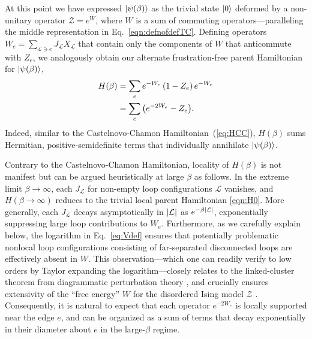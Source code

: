 \documentclass[aps,prl,twocolumn,floatfix,nofootinbib]{revtex4-2}
\theoremstyle{definition}
\begin{document}
At this point we have expressed $\ket{\psi(\beta)}$ as the trivial state $\ket{0}$ deformed by a non-unitary operator $\mathcal{Z} = e^{W}$, where $W$ is a sum of commuting operators---paralleling the middle representation in Eq.~\eqref{eqn:defnofdefTC}.  Defining operators $W_e = \sum_{\mathcal{L} \ni e} J_{\mathcal{L}} X_{\mathcal{L}}$ that contain only the components of $W$ that anticommute with $Z_e$, we analogously obtain our alternate
frustration-free parent Hamiltonian for $\ket{\psi(\beta)}$,
\begin{equation} \label{eqn:Hbeta}
    \begin{split}
        H(\beta) &= \sum_e e^{-W_e}\left(1 - Z_e\right)e^{-W_e} \\
        &= \sum_e \qty( e^{- 2W_e} - Z_e ).
    \end{split}
\end{equation}
Indeed, similar to the Castelnovo-Chamon Hamiltonian~(\ref{eq:HCC}), $H(\beta)$ sums Hermitian, positive-semidefinite terms that individually annihilate $\ket{\psi(\beta)}$.


Contrary to the Castelnovo-Chamon Hamiltonian, locality of $H(\beta)$ is not manifest but can be argued heuristically at large $\beta$ as follows.  In the extreme limit $\beta \to \infty$, each $J_{\mathcal{L}}$ for non-empty loop configurations $\mathcal{L}$ vanishes, and $H(\beta \to \infty)$ reduces to the trivial local parent Hamiltonian \eqref{eqn:H0}. More generally, each $J_{\mathcal{L}}$ decays asymptotically in $\abs{\mathcal{L}}$ as $e^{-\beta \abs{\mathcal{L}}}$, exponentially suppressing large loop contributions to $W_e$. Furthermore, as we carefully explain below, the logarithm in Eq.~\eqref{eq:Vdef} ensures that potentially problematic nonlocal loop configurations consisting of far-separated disconnected loops are effectively absent in $W$.
%
This observation---which one can readily verify to low orders by Taylor expanding the logarithm---closely relates to the linked-cluster theorem from diagrammatic perturbation theory \cite{zinn-justin_quantum_2021}, and crucially ensures extensivity of the ``free energy'' $W$ for the disordered Ising model $\mathcal{Z}$ \cite{kardarStatisticalPhysicsFields2007}. Consequently, it is natural to expect that each operator $e^{-2W_e}$ is locally supported near the edge $e$, and can be organized as a sum of terms that decay exponentially in their diameter about $e$ in the large-$\beta$ regime. 
\end{document}
